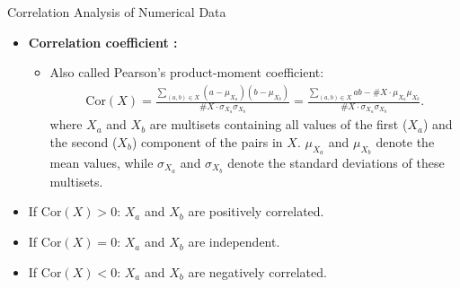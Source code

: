 \begin{frame}{Correlation Analysis of Numerical Data}
	\begin{itemize}
		\item \textbf{\color{airforceblue}Correlation coefficient :}
		\begin{itemize}
			\item Also called Pearson's product-moment coefficient:
			\begin{align}
				\text{Cor}(X) = \frac{\sum_{(a, b) \in X} 
				(a-\mu_{X_a})(b-\mu_{X_b})}{\#X\cdot\sigma_{X_a}\sigma_{X_b}} = 
				\frac{\sum_{(a, b) \in X}ab -\#X\cdot\mu_{X_a}\mu_{X_b}}{\#X\cdot
				\sigma_{X_a}\sigma_{X_b}}. 
			\end{align}
			where $X_a$ and $X_b$ are multisets containing all values of the 
			first 
			($X_a$) and the second ($X_b$) component of the pairs in $X$.  
			$\mu_{X_a}$ and $\mu_{X_b}$ denote the mean values, while 
			$\sigma_{X_a}$ and $\sigma_{X_b}$ denote the standard 
			deviations of these multisets.
		\end{itemize}
		\item If $\text{Cor}(X) > 0$: $X_a$ and $X_b$ are positively 
		correlated.
		\item If $\text{Cor}(X) = 0$: $X_a$ and $X_b$ are independent.
		\item If $\text{Cor}(X) < 0$: $X_a$ and $X_b$ are negatively 
		correlated.
	\end{itemize}
\end{frame}

